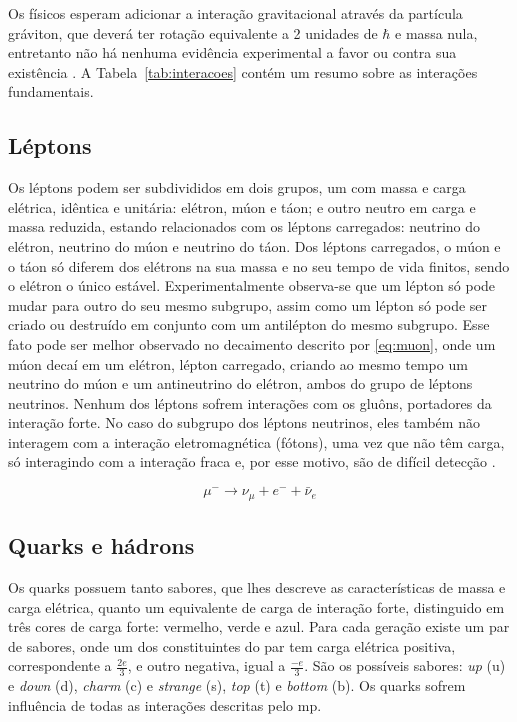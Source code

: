 Os físicos esperam adicionar a interação gravitacional
através da partícula gráviton, que deverá ter rotação equivalente a 2
unidades de $\hbar$ e massa nula, entretanto não há nenhuma evidência 
experimental a favor ou contra sua existência \cite{Beiser}.
A Tabela~\ref{tab:interacoes} contém um resumo sobre as interações
fundamentais.

\subsection{Léptons}
\label{ssec:leptons}

Os léptons podem ser subdivididos em dois grupos, 
um com massa e carga elétrica, idêntica e unitária: elétron, múon e táon; 
e outro neutro em carga e massa reduzida, estando relacionados com os léptons
carregados: neutrino do elétron, neutrino do múon e neutrino do táon. Dos
léptons carregados, o múon e o táon só diferem dos elétrons na sua massa e no
seu tempo de vida finitos, sendo o elétron o único estável.
Experimentalmente observa-se que um lépton só pode mudar para outro do seu mesmo
subgrupo, assim como um lépton só pode ser criado ou destruído em conjunto com
um antilépton do mesmo subgrupo. Esse fato pode ser melhor observado no
decaimento descrito por \ref{eq:muon}, onde um múon decaí em um
elétron, lépton carregado, criando ao mesmo tempo um neutrino do múon e um
antineutrino do elétron, ambos do grupo de léptons neutrinos.
Nenhum dos léptons sofrem interações com os gluôns, portadores da interação forte.
No caso do subgrupo dos léptons neutrinos, eles também não interagem com a
interação eletromagnética (fótons), 
uma vez que não têm carga, só interagindo com a interação fraca e, por esse motivo,
são de difícil detecção \cite{Intro_Nuclear,Intro_Standard}.

\begin{equation} \label{eq:muon}
\mu^{-} \rightarrow \nu_{\mu} + e^- + \bar{\nu}_{e}
\end{equation}

\subsection{Quarks e hádrons}
\label{ssec:quarks}

Os quarks possuem tanto sabores, que lhes descreve as características de massa e
carga elétrica, quanto um equivalente de carga de interação
forte, distinguido em três cores de carga forte: vermelho, verde e azul. 
Para cada geração existe um par de sabores, onde um dos constituintes do par tem
carga elétrica positiva, correspondente a $\frac{2e}{3}$,
e outro negativa, igual a $\frac{-e}{3}$. São os possíveis sabores: \emph{up}
(u) e \emph{down} (d), \emph{charm} (c) e \emph{strange} (s), \emph{top} (t) e
\emph{bottom} (b). Os quarks sofrem influência de todas as interações descritas
pelo \gls{mp}.


